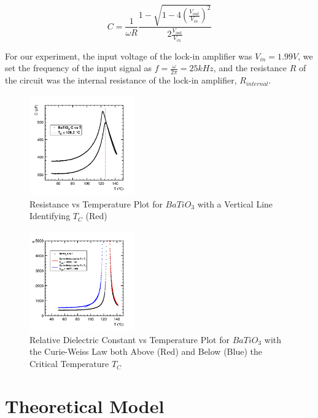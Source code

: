 \documentclass[%
 reprint,
 amsmath,amssymb,
 aps,
 pra,
]{revtex4-1}
\begin{document}
\begin{equation}\label{Eq:VtoC}
C = \frac{1}{\omega R} \frac{1 - \sqrt{1 - 4(\frac{V_{out}}{V_{in}})^2 }}{2\frac{V_{out}}{V_{in}}}
\end{equation}

\noindent For our experiment, the input voltage of the lock-in amplifier was $V_{in} = 1.99V$, we set the frequency of the input signal as $f = \frac{\omega}{2\pi} = 25kHz$, and the resistance $R$ of the circuit was the internal resistance of the lock-in amplifier, $R_{internal}$.

\begin{figure}[H]
	\centering
	\includegraphics[width=0.4\textwidth]{BaTiO3_CvT_withTC.png}
	\caption{Resistance vs Temperature Plot for $BaTiO_{3}$ with a Vertical Line Identifying $T_{C}$ (Red)}
	\label{Fig:CvT1}
\end{figure}

\begin{figure}[H]
	\centering
	\includegraphics[width=0.4\textwidth]{BaTiO3_kvT.png}
	\caption{Relative Dielectric Constant vs Temperature Plot for $BaTiO_{3}$ with the Curie-Weiss Law both Above (Red) and Below (Blue) the Critical Temperature $T_{C}$}
	\label{Fig:kvT}
\end{figure}

\section{Theoretical Model}
\end{document}
